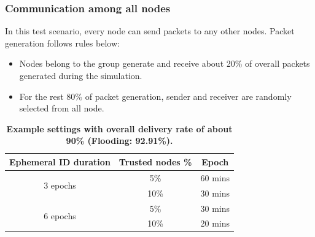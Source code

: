 \documentclass[11pt]{article}
\begin{document}

\clearpage
\subsubsection{Communication among all nodes}
In this test scenario, every node can send packets to any other nodes.
Packet generation follows rules below:
\begin{itemize}
\item Nodes belong to the group generate and receive about 20\% of overall packets generated during the simulation. 
\item For the rest 80\% of packet generation, sender and receiver are randomly selected from all node. 
\end{itemize}



\begin{table}[!h]
\center
\begin{tabular}[!h]{|c|c|c|}
\hline
Ephemeral ID duration	& Trusted nodes \%	& Epoch	\\	
\hline
\hline
\multirow{2}{*}{3 epochs}	& 5\%				& 60 mins	\\
							& 10\%				& 30 mins	\\
\hline
\multirow{2}{*}{6 epochs}	& 5\%			& 30 mins \\
							& 10\%			& 20 mins \\
\hline
\end{tabular}
\vspace{10pt}
\caption{{ \bf Example settings with overall delivery rate of about 90\% (Flooding: 92.91\%).}}
\label{tab:dataset_summary}
\end{table}
\end{document}
